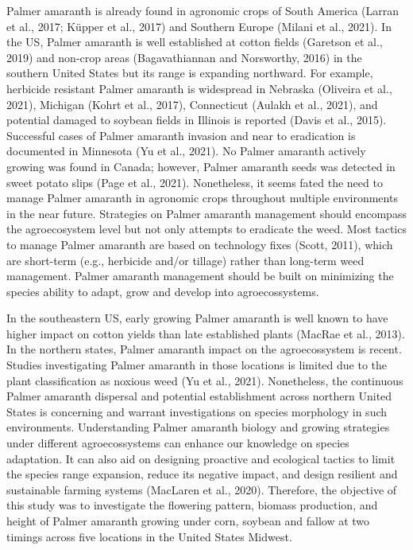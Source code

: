 \documentclass[utf8]{frontiersSCNS}
\begin{document}
Palmer amaranth is already found in agronomic crops of South America
(Larran et al., 2017; Küpper et al., 2017) and Southern Europe (Milani
et al., 2021). In the US, Palmer amaranth is well established at cotton
fields (Garetson et al., 2019) and non-crop areas (Bagavathiannan and
Norsworthy, 2016) in the southern United States but its range is
expanding northward. For example, herbicide resistant Palmer amaranth is
widespread in Nebraska (Oliveira et al., 2021), Michigan (Kohrt et al.,
2017), Connecticut (Aulakh et al., 2021), and potential damaged to
soybean fields in Illinois is reported (Davis et al., 2015). Successful
cases of Palmer amaranth invasion and near to eradication is documented
in Minnesota (Yu et al., 2021). No Palmer amaranth actively growing was
found in Canada; however, Palmer amaranth seeds was detected in sweet
potato slips (Page et al., 2021). Nonetheless, it seems fated the need
to manage Palmer amaranth in agronomic crops throughout multiple
environments in the near future. Strategies on Palmer amaranth
management should encompass the agroecosystem level but not only
attempts to eradicate the weed. Most tactics to manage Palmer amaranth
are based on technology fixes (Scott, 2011), which are short-term (e.g.,
herbicide and/or tillage) rather than long-term weed management. Palmer
amaranth management should be built on minimizing the species ability to
adapt, grow and develop into agroecossystems.

In the southeastern US, early growing Palmer amaranth is well known to
have higher impact on cotton yields than late established plants (MacRae
et al., 2013). In the northern states, Palmer amaranth impact on the
agroecossystem is recent. Studies investigating Palmer amaranth in those
locations is limited due to the plant classification as noxious weed (Yu
et al., 2021). Nonetheless, the continuous Palmer amaranth dispersal and
potential establishment across northern United States is concerning and
warrant investigations on species morphology in such environments.
Understanding Palmer amaranth biology and growing strategies under
different agroecossystems can enhance our knowledge on species
adaptation. It can also aid on designing proactive and ecological
tactics to limit the species range expansion, reduce its negative
impact, and design resilient and sustainable farming systems (MacLaren
et al., 2020). Therefore, the objective of this study was to investigate
the flowering pattern, biomass production, and height of Palmer amaranth
growing under corn, soybean and fallow at two timings across five
locations in the United States Midwest.
\end{document}
